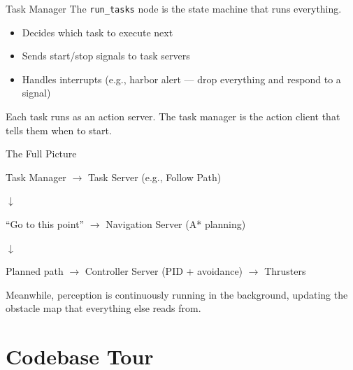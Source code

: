 \documentclass[aspectratio=169]{beamer}
\begin{document}
\begin{frame}{Task Manager}
    The \texttt{run\_tasks} node is the state machine that runs everything.
    \vfill
    \begin{itemize}
        \item Decides which task to execute next
        \item Sends start/stop signals to task servers
        \item Handles interrupts (e.g., harbor alert --- drop everything and respond to a signal)
    \end{itemize}
    \vfill
    Each task runs as an action server. The task manager is the action client that tells them when to start.
\end{frame}

\begin{frame}{The Full Picture}
    \begin{center}
        \small
        Task Manager $\rightarrow$ Task Server (e.g., Follow Path)
    \end{center}
    \begin{center}
        $\downarrow$
    \end{center}
    \begin{center}
        \small
        ``Go to this point'' $\rightarrow$ Navigation Server (A* planning)
    \end{center}
    \begin{center}
        $\downarrow$
    \end{center}
    \begin{center}
        \small
        Planned path $\rightarrow$ Controller Server (PID + avoidance) $\rightarrow$ Thrusters
    \end{center}
    \vfill
    Meanwhile, perception is continuously running in the background, updating the obstacle map that everything else reads from.
\end{frame}

\section{Codebase Tour}
\end{document}
